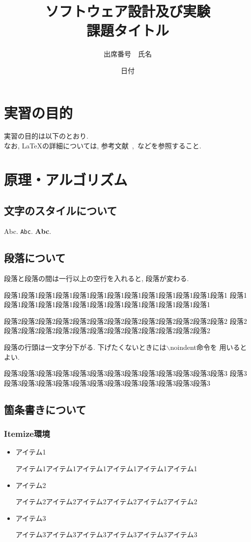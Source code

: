 \documentclass{jarticle}
\title{ソフトウェア設計及び実験\\課題タイトル}
\author{出席番号　氏名}
\date{日付}
\begin{document}
\maketitle

\section{実習の目的}
%
実習の目的は以下のとおり.\\
なお, {\LaTeX}の詳細については, 参考文献~\cite{okumura},~\cite{matsuda}などを参照すること. 

\section{原理・アルゴリズム}
%
\subsection{文字のスタイルについて}
%
Abc. \texttt{Abc}. \textbf{Abc}. 

\subsection{段落について}

段落と段落の間は一行以上の空行を入れると, 段落が変わる. 

段落1段落1段落1段落1段落1段落1段落1段落1段落1段落1段落1段落1段落1
段落1段落1段落1段落1段落1段落1段落1段落1段落1段落1段落1段落1段落1

段落2段落2段落2段落2段落2段落2段落2段落2段落2段落2段落2段落2段落2
段落2段落2段落2段落2段落2段落2段落2段落2段落2段落2段落2段落2段落2

段落の行頭は一文字分下がる. 下げたくないときには$\backslash$noindent命令を
用いるとよい. 

\noindent
段落3段落3段落3段落3段落3段落3段落3段落3段落3段落3段落3段落3段落3
段落3段落3段落3段落3段落3段落3段落3段落3段落3段落3段落3段落3段落3

\subsection{箇条書きについて}
%
\subsubsection{Itemize環境}

\begin{itemize}
\item アイテム1

アイテム1アイテム1アイテム1アイテム1アイテム1アイテム1

\item アイテム2

アイテム2アイテム2アイテム2アイテム2アイテム2アイテム2

\item アイテム3

アイテム3アイテム3アイテム3アイテム3アイテム3アイテム3
\end{itemize}
\end{document}
